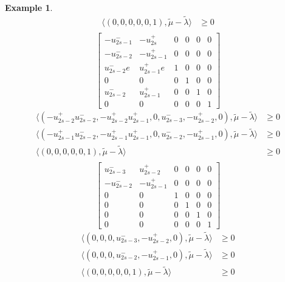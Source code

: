 \documentclass{amsart}
\newtheorem{example}[theorem]{Example}
\numberwithin{theorem}{section}
\begin{document}
\begin{example}
\begin{align*}
      \langle (0,0,0,0,0,1), \tilde\mu - \tilde\lambda\rangle &\ge 0\\ 
    \end{align*}
    \[
      \left[\begin{array}{cccccc} 
        -u_{2s-1}^- & -u_{2s}^+ & 0 & 0 & 0 & 0\\
        -u_{2s-2}^- & -u_{2s-1}^+ & 0 & 0 & 0 & 0\\
        u_{2s-2}^-e & u_{2s-1}^+e & 1 & 0 & 0 & 0\\
        0 & 0 & 0 & 1 & 0 & 0\\
        u_{2s-2}^- & u_{2s-1}^+ & 0 & 0 & 1 & 0\\
        0 & 0 & 0 & 0 & 0 & 1
      \end{array}\right]
    \]
    \begin{align*}
      \langle (-u_{2s-2}^+u_{2s-2}^-,-u_{2s-2}^+u_{2s-1}^+,0,u_{2s-3}^-,-u_{2s-2}^+,0), \tilde\mu - \tilde\lambda\rangle &\ge 0\\ 
      \langle (-u_{2s-1}^+u_{2s-2}^-,-u_{2s-1}^+u_{2s-1}^+,0,u_{2s-2}^-,-u_{2s-1}^+,0), \tilde\mu - \tilde\lambda\rangle &\ge 0\\ 
      \langle (0,0,0,0,0,1), \tilde\mu - \tilde\lambda\rangle &\ge 0\\ 
    \end{align*}
    \[
      \left[\begin{array}{cccccc} 
        u_{2s-3}^- & u_{2s-2}^+ & 0 & 0 & 0 & 0\\
        -u_{2s-2}^- & -u_{2s-1}^+ & 0 & 0 & 0 & 0\\
        0 & 0 & 1 & 0 & 0 & 0\\
        0 & 0 & 0 & 1 & 0 & 0\\
        0 & 0 & 0 & 0 & 1 & 0\\
        0 & 0 & 0 & 0 & 0 & 1
      \end{array}\right]
    \]
    \begin{align*}
      \langle (0,0,0,u_{2s-3}^-,-u_{2s-2}^+,0), \tilde\mu - \tilde\lambda\rangle &\ge 0\\ 
      \langle (0,0,0,u_{2s-2}^-,-u_{2s-1}^+,0), \tilde\mu - \tilde\lambda\rangle &\ge 0\\ 
      \langle (0,0,0,0,0,1), \tilde\mu - \tilde\lambda\rangle &\ge 0\\ 
    \end{align*}


\end{example}
\end{document}
